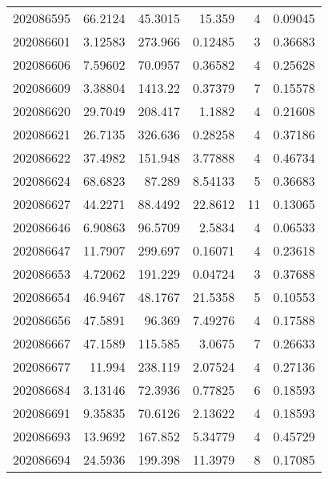 \begin{tabular}{rrrrrr}
 202086595 &         66.2124  &       45.3015 &           15.359   &           4 & 0.09045 \\
 202086601 &          3.12583 &      273.966  &            0.12485 &           3 & 0.36683 \\
 202086606 &          7.59602 &       70.0957 &            0.36582 &           4 & 0.25628 \\
 202086609 &          3.38804 &     1413.22   &            0.37379 &           7 & 0.15578 \\
 202086620 &         29.7049  &      208.417  &            1.1882  &           4 & 0.21608 \\
 202086621 &         26.7135  &      326.636  &            0.28258 &           4 & 0.37186 \\
 202086622 &         37.4982  &      151.948  &            3.77888 &           4 & 0.46734 \\
 202086624 &         68.6823  &       87.289  &            8.54133 &           5 & 0.36683 \\
 202086627 &         44.2271  &       88.4492 &           22.8612  &          11 & 0.13065 \\
 202086646 &          6.90863 &       96.5709 &            2.5834  &           4 & 0.06533 \\
 202086647 &         11.7907  &      299.697  &            0.16071 &           4 & 0.23618 \\
 202086653 &          4.72062 &      191.229  &            0.04724 &           3 & 0.37688 \\
 202086654 &         46.9467  &       48.1767 &           21.5358  &           5 & 0.10553 \\
 202086656 &         47.5891  &       96.369  &            7.49276 &           4 & 0.17588 \\
 202086667 &         47.1589  &      115.585  &            3.0675  &           7 & 0.26633 \\
 202086677 &         11.994   &      238.119  &            2.07524 &           4 & 0.27136 \\
 202086684 &          3.13146 &       72.3936 &            0.77825 &           6 & 0.18593 \\
 202086691 &          9.35835 &       70.6126 &            2.13622 &           4 & 0.18593 \\
 202086693 &         13.9692  &      167.852  &            5.34779 &           4 & 0.45729 \\
 202086694 &         24.5936  &      199.398  &           11.3979  &           8 & 0.17085 \\

\end{tabular}
